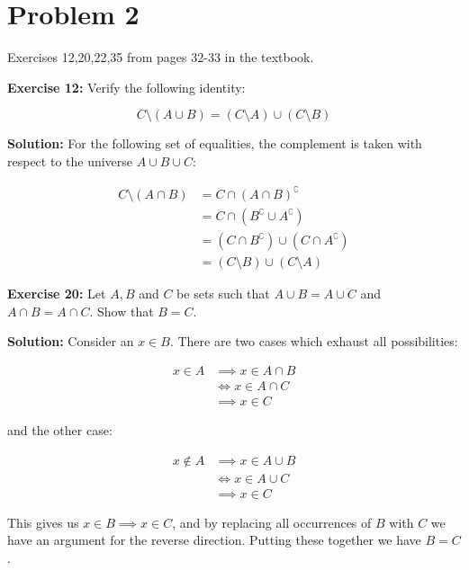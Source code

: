 \documentclass{article}
\begin{document}
\section*{Problem 2}
Exercises 12,20,22,35 from pages 32-33 in the textbook.
\bigskip

\noindent\textbf{Exercise 12:} Verify the following identity:

\begin{equation*}
    C\setminus (A\cup B)=(C\setminus A)\cup(C\setminus B)
\end{equation*}

\noindent\textbf{Solution:} For the following set of equalities, the complement is taken with respect to the universe $A\cup B\cup C$:

\begin{align*}
    C\setminus(A\cap B)&=C\cap(A\cap B)^\complement\tag{relative complement}\\
    &=C\cap(B^\complement\cup A^\complement)\tag{DeMorgan's Law}\\
    &=(C\cap B^\complement)\cup (C\cap A^\complement)\tag{distributivity of intersction}\\
    &=(C\setminus B)\cup (C\setminus A)\tag{relative complement}
\end{align*}
\bigskip

\noindent\textbf{Exercise 20:} Let $A, B$ and $C$ be sets such that $A\cup B=A\cup C$ and $A\cap B = A\cap C$. Show that $B = C$.
\bigskip

\noindent\textbf{Solution:} Consider an $x\in B$. There are two cases which exhaust all possibilities:

\begin{align*}
    x\in A&\implies x\in A\cap B\\
    &\iff x\in A\cap C\tag{assumption}\\
    &\implies x\in C
\end{align*}

and the other case:

\begin{align*}
    x\not\in A&\implies x\in A\cup B\\
    &\iff x\in A\cup C\tag{assumption}\\
    &\implies x\in C
\end{align*}

This gives us $x\in B\implies x\in C$, and by replacing all occurrences of $B$ with $C$ we have an argument for the reverse direction. Putting these together we have $B=C$.
\bigskip
\end{document}
